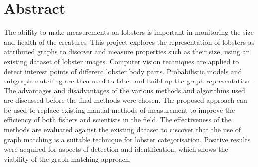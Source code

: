 \section*{Abstract}
The ability to make measurements on lobsters is important in monitoring the size and health of the creatures.
This project explores the representation of lobsters as attributed graphs to discover and measure properties such as their size, using an existing dataset of lobster images.
Computer vision techniques are applied to detect interest points of different lobster body parts. 
Probabilistic models and subgraph matching are then used to label and build up the graph representation.
The advantages and disadvantages of the various methods and algorithms used are discussed before the final methods were chosen. 
The proposed approach can be used to replace existing manual methods of measurement to improve the efficiency of both fishers and scientists in the field. 
The effectiveness of the methods are evaluated against the existing dataset to discover that the use of graph matching is a suitable technique for lobster categorisation. 
Positive results were acquired for aspects of detection and identification, which shows the viability of the graph matching approach.


